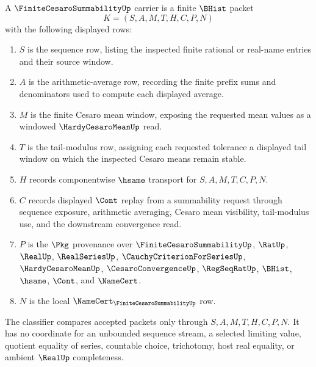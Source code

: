 \begin{definition}
\label{def:finite-cesaro-summability-carrier}
A $\FiniteCesaroSummabilityUp$ carrier is a finite $\BHist$ packet
$$
K=(S,A,M,T,H,C,P,N)
$$
with the following displayed rows:
\begin{enumerate}
\item $S$ is the sequence row, listing the inspected finite rational or real-name entries and their source window.
\item $A$ is the arithmetic-average row, recording the finite prefix sums and denominators used to compute each displayed average.
\item $M$ is the finite Cesaro mean window, exposing the requested mean values as a windowed $\HardyCesaroMeanUp$ read.
\item $T$ is the tail-modulus row, assigning each requested tolerance a displayed tail window on which the inspected Cesaro means remain stable.
\item $H$ records componentwise $\hsame$ transport for $S,A,M,T,C,P,N$.
\item $C$ records displayed $\Cont$ replay from a summability request through sequence exposure, arithmetic averaging, Cesaro mean visibility, tail-modulus use, and the downstream convergence read.
\item $P$ is the $\Pkg$ provenance over $\FiniteCesaroSummabilityUp$, $\RatUp$, $\RealUp$, $\RealSeriesUp$, $\CauchyCriterionForSeriesUp$, $\HardyCesaroMeanUp$, $\CesaroConvergenceUp$, $\RegSeqRatUp$, $\BHist$, $\hsame$, $\Cont$, and $\NameCert$.
\item $N$ is the local $\NameCert_{\FiniteCesaroSummabilityUp}$ row.
\end{enumerate}
The classifier compares accepted packets only through $S,A,M,T,H,C,P,N$. It has no coordinate for an unbounded sequence stream, a selected limiting value, quotient equality of series, countable choice, trichotomy, host real equality, or ambient $\RealUp$ completeness.
\end{definition}

